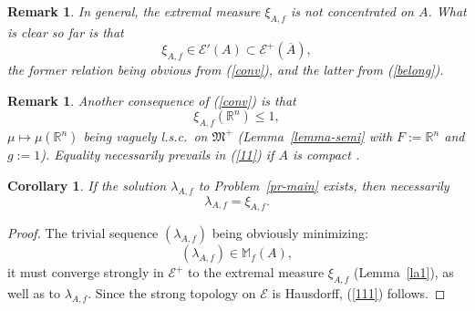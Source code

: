 \documentclass[12pt,a4paper,reqno]{amsart} %
\theoremstyle{lause}
\theoremstyle{maaritelma}
\theoremstyle{lause}
\newtheorem{corollary}[theorem]{Corollary}
\theoremstyle{maaritelma}
\newtheorem{remark}[theorem]{Remark}
\numberwithin{equation}{section}
\begin{document}
\begin{remark}\label{tmass}In general, the extremal measure $\xi_{A,f}$ is {\it not} concentrated on $A$. What is clear so far is that
\begin{equation*}\label{Eq}
\xi_{A,f}\in\mathcal E'(A)\subset\mathcal E^+(\overline{A}),
\end{equation*}
the former relation being obvious from (\ref{conv}), and the latter from (\ref{belong}).\end{remark}

\begin{remark}\label{tmass'}Another consequence of (\ref{conv}) is that
\begin{equation}\label{11}
\xi_{A,f}(\mathbb R^n)\leqslant1,
\end{equation}
$\mu\mapsto\mu(\mathbb R^n)$ being vaguely l.s.c.\ on $\mathfrak M^+$ (Lemma~\ref{lemma-semi} with $F:=\mathbb R^n$ and $g:=1$). {\it Equality necessarily prevails in {\rm(\ref{11})} if $A$ is compact} \cite[Section~III.1.9, Corollary~3]{B2}.
\end{remark}

\begin{corollary}\label{cor-sol-extr}
  If the solution $\lambda_{A,f}$ to Problem~{\rm\ref{pr-main}} exists, then necessarily
  \begin{equation}\label{111}\lambda_{A,f}=\xi_{A,f}.\end{equation}
\end{corollary}

\begin{proof}
The trivial sequence $(\lambda_{A,f})$ being obviously minimizing:
\[(\lambda_{A,f})\in\mathbb M_f(A),\]
it must converge strongly in $\mathcal E^+$ to the extremal measure $\xi_{A,f}$ (Lemma~\ref{la1}), as well as to $\lambda_{A,f}$. Since the strong topology on $\mathcal E$ is Hausdorff, (\ref{111}) follows.
\end{proof}
\end{document}
